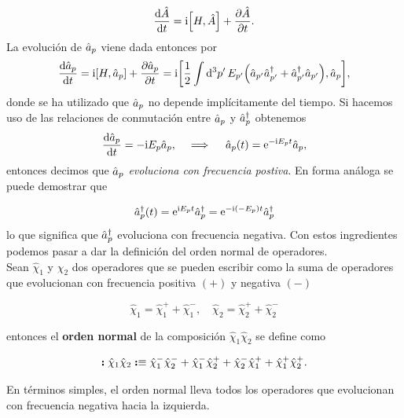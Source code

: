\begin{equation}
    \dv{\OA}{t} = \ii \comm{\OH}{\OA}+\pdv{\OA}{t}.
\end{equation}
La evolución de $\hat{a}_p$ viene dada entonces por
\begin{equation}
    \dv{\Oa_p}{t} = \ii \comm{\OH}{\Oa_p}+\pdv{\Oa_p}{t} = \ii \comm{\frac{1}{2} \int \dd[3]{p^\prime} E_{p^\prime} \qty( \Oa_{p^\prime} \Oa^{\dag}_{p^\prime} + \Oa^{\dag}_{p^\prime}\Oa_{p^\prime})}{\Oa_p},  
\end{equation}
donde se ha utilizado que $\hat{a}_p$ no depende implícitamente del tiempo. Si hacemos uso de las relaciones de conmutación entre $\hat{a}_p$ y $\hat{a}^\dagger_p$ obtenemos
\begin{equation}
     \dv{\hat{a}_p}{t} = - \mathrm{i} E_p \hat{a}_p, \quad \implies \quad \hat{a}_p(t) = \mathrm{e}^{-\mathrm{i} E_p t}\hat{a}_p,
\end{equation}
entonces decimos que $\hat{a}_p$ \emph{evoluciona con frecuencia postiva}. En forma análoga se puede demostrar que 

\begin{equation}
    \hat{a}_p^\dag (t) =  \mathrm{e}^{\mathrm{i} E_p t}\hat{a}_p^\dagger = \mathrm{e}^{-\mathrm{i} (-E_p) t}\hat{a}_p^\dagger
\end{equation}
lo que significa que $\hat{a}_p^\dag$ evoluciona con frecuencia negativa. Con estos ingredientes podemos pasar a dar la definición del orden normal de operadores. \\

Sean $\hat{\chi}_1$ y $\hat{\chi}_2$ dos operadores que se pueden escribir como la suma de operadores que evolucionan con frecuencia positiva $(+)$ y negativa $(-)$

\begin{equation}
    \hat{\chi}_1 = \hat{\chi}_1^+ + \hat{\chi}_1^- , \quad \hat{\chi}_2 = \hat{\chi}_2^+ + \hat{\chi}_2^-
\end{equation}

\newcommand{\onor}{\vb*{:}}
entonces el \textbf{orden normal} de la composición $\hat{\chi}_1 \hat{\chi}_2$ se define como

\begin{equation}
    \onor \hat{\chi}_1 \hat{\chi}_2 \onor  \equiv \hat{\chi}_1^- \hat{\chi}_2^- + \hat{\chi}_1^- \hat{\chi}_2^+ + \hat{\chi}_2^- \hat{\chi}_1^+ +\hat{\chi}_1^+ \hat{\chi}_2^+ .
    \label{eq_3.64}
\end{equation}

En términos simples, el orden normal lleva todos los operadores que evolucionan con frecuencia negativa hacia la izquierda.\\

